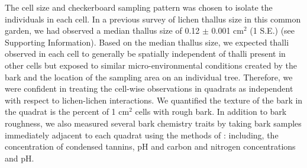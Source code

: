 \documentclass[11pt,twocolumn,twoside,lineno]{pnas-new}
\begin{document}
{The cell size and checkerboard sampling pattern was chosen to isolate
the individuals in each cell. In a previous survey of lichen thallus
size in this common garden, we had observed a median thallus size of
0.12 $\pm$ 0.001 cm$^2$ (1 S.E.) (see Supporting Information). Based
on the median thallus size, we expected thalli observed in each cell
to generally be spatially independent of thalli present in other cells
but exposed to similar micro-environmental conditions created by the
bark and the location of the sampling area on an individual
tree. Therefore, we were confident in treating the cell-wise
observations in quadrats as independent with respect to lichen-lichen
interactions. We quantified the texture of the bark in the quadrat is
the percent of 1 cm$^2$ cells with rough bark. In addition to bark
roughness, we also measured several bark chemistry traits by taking
bark samples immediately adjacent to each quadrat using the methods of
\citep{Lamit2011}: including, the concentration of condensed tannins,
pH and carbon and nitrogen concentrations and pH.

}
\end{document}
